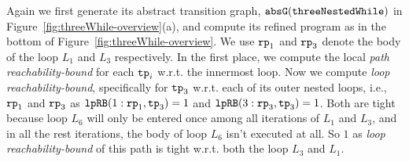 \begin{example}
Again we first generate its abstract transition graph, $\mathtt{abs}{\mathtt{G}}(\mathtt{threeNestedWhile})$ in Figure~\ref{fig:threeWhile-overview}(a),
and compute its refined program as in the bottom of Figure~\ref{fig:threeWhile-overview}. 
We use $\mathtt{rp}_1$ and $\mathtt{rp}_3$ denote the body of the loop $L_1$ and $L_3$ respectively.
In the first place, we compute the local \emph{path reachability-bound} for each $\mathtt{tp}_i$ w.r.t. the innermost loop.
Now we compute \emph{loop reachability-bound}, specifically for $\mathtt{tp}_3$ w.r.t. each of its outer nested loops, i.e., $\mathtt{rp}_1$ and $\mathtt{rp}_3$ as
$\mathtt{lpRB}(1: \mathtt{rp}_1, \mathtt{tp}_3) = 1$ and
$\mathtt{lpRB}(3: \mathtt{rp}_3, \mathtt{tp}_3) = 1$.
Both are tight because loop $L_6$ will only be entered once among all iterations of $L_1$ and $L_3$, and in all the rest iterations, the body of loop $L_6$ isn't executed at all.
So $1$ as \emph{loop reachability-bound} of this path is tight w.r.t. both the loop $L_3$ and $L_1$.
\end{example}

